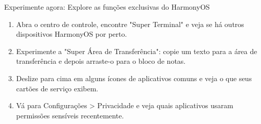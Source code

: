 \begin{tcbpractice}{Experimente agora: Explore as funções exclusivas do HarmonyOS}
\begin{enumerate}
  \item Abra o centro de controle, encontre "Super Terminal" e veja se há outros dispositivos HarmonyOS por perto.
  \item Experimente a "Super Área de Transferência": copie um texto para a área de transferência e depois arraste-o para o bloco de notas.
  \item Deslize para cima em alguns ícones de aplicativos comuns e veja o que seus cartões de serviço exibem.
  \item Vá para Configurações > Privacidade e veja quais aplicativos usaram permissões sensíveis recentemente.
\end{enumerate}

\end{tcbpractice}
